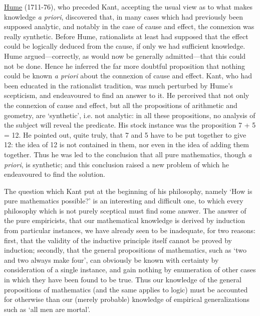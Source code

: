 \documentclass[oneside,letterpaper,12pt]{book}
\begin{document}
\href{https://plato.stanford.edu/entries/hume/}{Hume} (1711-76), 
who preceded Kant, accepting the usual view as to what
makes knowledge \emph{a priori}, discovered that, in many cases which
had previously been supposed analytic, and notably in the case of cause
and effect, the connexion was really synthetic. Before Hume,
rationalists at least had supposed that the effect could be logically
deduced from the cause, if only we had sufficient knowledge. Hume
argued---correctly, as would now be generally admitted---that this could
not be done. Hence he inferred the far more doubtful proposition that
nothing could be known \emph{a priori} about the connexion of cause and
effect. Kant, who had been educated in the rationalist tradition, was
much perturbed by Hume's scepticism, and endeavoured to
find an answer to it. He perceived that not only the connexion of cause
and effect, but all the propositions of arithmetic and geometry, are
`synthetic', i.e. not analytic: in all
these propositions, no analysis of the subject will reveal the
predicate. His stock instance was the proposition 7 + 5 = 12. He pointed
out, quite truly, that 7 and 5 have to be put together to give 12: the
idea of 12 is not contained in them, nor even in the idea of adding them
together. Thus he was led to the conclusion that all pure mathematics,
though \emph{a priori}, is synthetic; and this conclusion raised a new
problem of which he endeavoured to find the solution.

The question which Kant put at the beginning of his philosophy, namely
`How is pure mathematics possible?' is
an interesting and difficult one, to which every philosophy which is not
purely sceptical must find some answer. \label{instances} The answer of the pure
empiricists, that our mathematical knowledge is derived by induction
from particular instances, we have already seen to be inadequate, for
two reasons: first, that the validity of the inductive principle itself
cannot be proved by induction; secondly, that the general propositions
of mathematics, such as `two and two always make
four', can obviously be known with certainty by
consideration of a single instance, and gain nothing by enumeration of
other cases in which they have been found to be true. Thus our knowledge
of the general propositions of mathematics (and the same applies to
logic) must be accounted for otherwise than our (merely probable)
knowledge of empirical generalizations such as `all men
are mortal'.
\end{document}
